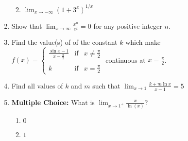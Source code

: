 \documentclass[12pt]{article}
\newif\ifans
\begin{document}
\begin{enumerate}
\begin{enumerate}
\ifans{\fbox{$3$}} \fi

\item $\lim_{x \rightarrow -\infty}{(1+3^x)^{1/x}}$

\ifans{\fbox{$1$}} \fi

\end{enumerate}

\newpage

\item Show that $\lim_{x \rightarrow \infty}{\frac{x^n}{e^x}}=0$ for any positive integer $n$.

\ifans{\fbox{\parbox{1\linewidth}{$\lim_{x \rightarrow \infty}{\frac{x^n}{e^x}}$ is of the indeterminate form $\frac{\infty}{\infty}$, so, we may apply L'Hopital's Rule:
$$\lim_{x \rightarrow \infty}{\frac{x^n}{e^x}}=\lim_{x \rightarrow \infty}{\frac{nx^{n-1}}{e^x}}$$
This new limit is also of the indeterminate form $\frac{\infty}{\infty}$, so, we may again apply L'Hopital's Rule:
$$\lim_{x \rightarrow \infty}{\frac{nx^{n-1}}{e^x}}=\lim_{x \rightarrow \infty}{\frac{n(n-1)x^{n-2}}{e^x}}$$
In fact, we repeat the process until we end up with the following limit:
$$\lim_{x \rightarrow \infty}{\frac{n(n-1)(n-2)\dots(2)(1)}{e^x}}$$
which equals 0.  Thus, $\lim_{x \rightarrow \infty}{\frac{x^n}{e^x}}=0$}}} \fi

\item Find the value(s) of of the constant $k$ which make $f(x)=\left\{\begin{array}{lll}
\frac{\sin{x}-1}{x-\frac{\pi}{2}} & \text{if} & x \neq \frac{\pi}{2}\\
&&\\
k & \text{if} & x=\frac{\pi}{2}
\end{array}\right.$ continuous at $x=\frac{\pi}{2}$.

\ifans{\fbox{$k=0$}} \fi

\item Find all values of $k$ and $m$ such that $\lim_{x \rightarrow 1}{\frac{k+m\ln{x}}{x-1}}=5$

\ifans{\fbox{$k=0$ and $m=5$}} \fi

\item {\bf Multiple Choice:} What is $\displaystyle \lim_{x\rightarrow 1^+} \frac{x}{\ln(x)}$?

\begin{enumerate}

\item $0$

\item $1$


\end{enumerate}
\end{enumerate}
\end{document}
